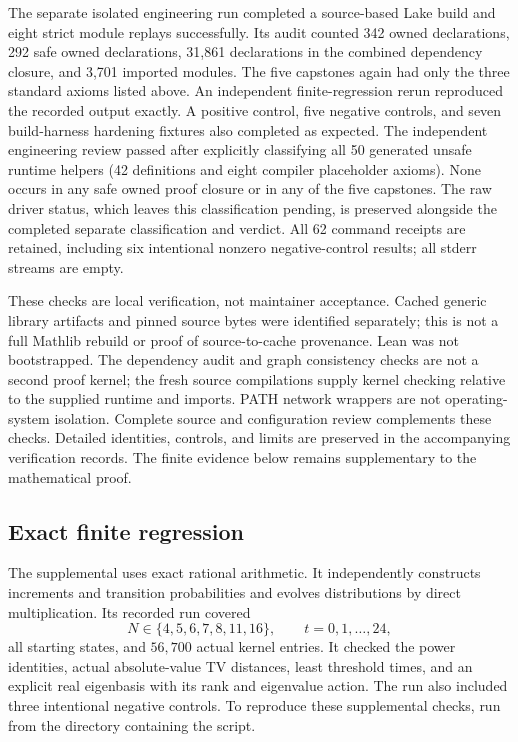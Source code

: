 \documentclass[11pt,a4paper]{article}
\theoremstyle{definition}
\theoremstyle{remark}
\newcommand{\code}[1]{\texttt{\detokenize{#1}}}
\newcommand{\module}[1]{\texttt{\detokenize{#1}}}
\begin{document}
The separate isolated engineering run completed a source-based Lake build
and eight strict module replays successfully. Its audit counted 342 owned
declarations, 292 safe owned declarations, 31,861 declarations in the
combined dependency closure, and 3,701 imported modules. The five capstones
again had only the three standard axioms listed above. An independent
finite-regression rerun reproduced the recorded output exactly. A positive
control, five negative controls, and seven build-harness hardening fixtures
also completed as expected. The independent engineering review passed after
explicitly classifying all 50 generated unsafe runtime helpers (42 definitions
and eight compiler placeholder axioms). None occurs in any safe owned proof
closure or in any of the five capstones. The raw driver status, which leaves
this classification pending, is preserved alongside the completed separate
classification and verdict. All 62 command receipts are retained, including
six intentional nonzero negative-control results; all stderr streams are empty.

These checks are local verification, not maintainer acceptance. Cached generic
library artifacts and pinned source bytes were identified separately; this is
not a full Mathlib rebuild or proof of source-to-cache provenance. Lean was
not bootstrapped. The dependency audit and graph consistency checks are not a
second proof kernel; the fresh source compilations supply kernel checking
relative to the supplied runtime and imports. PATH network wrappers are not
operating-system isolation. Complete source and configuration review complements
these checks. Detailed identities, controls, and limits are preserved in the
accompanying verification records. The finite evidence below remains
supplementary to the mathematical proof.

\subsection{Exact finite regression}

The supplemental \module{exact_regression.py} uses exact rational
arithmetic. It independently constructs increments and transition
probabilities and evolves distributions by direct multiplication. Its
recorded run covered
\[
N\in\{4,5,6,7,8,11,16\},\qquad t=0,1,\ldots,24,
\]
all starting states, and $56{,}700$ actual kernel entries. It checked the
power identities, actual absolute-value TV distances, least threshold
times, and an explicit real eigenbasis with its rank and eigenvalue action.
The run also included three intentional negative controls. To reproduce
these supplemental checks, run \code{python3 exact_regression.py} from the
directory containing the script.
\end{document}
